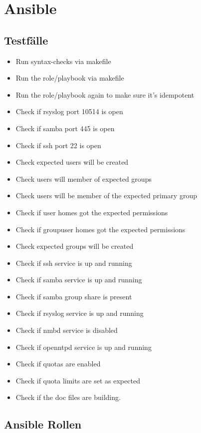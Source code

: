 \section{Ansible}
\subsection{Testfälle}
\begin{itemize}
  \item Run syntax-checks via makefile
  \item Run the role/playbook via makefile
  \item Run the role/playbook again to make sure it's idempotent
  \item Check if rsyslog port 10514 is open
  \item Check if samba port 445 is open
  \item Check if ssh port 22 is open
  \item Check expected users will be created
  \item Check users will member of expected groups
  \item Check users will be member of the expected primary group
  \item Check if user homes got the expected permissions
  \item Check if groupuser homes got the expected permissions
  \item Check expected groups will be created
  \item Check if ssh service is up and running
  \item Check if samba service is up and running
  \item Check if samba group share is present
  \item Check if rsyslog service is up and running
  \item Check if nmbd service is disabled
  \item Check if openntpd service is up and running
  \item Check if quotas are enabled
  \item Check if quota limits are set as expected
  \item Check if the doc files are building.
\end{itemize}
\subsection{Ansible Rollen}
